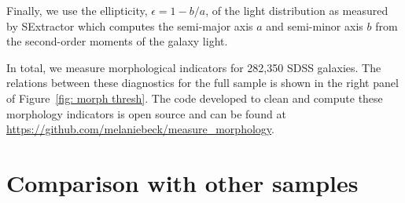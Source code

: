 Finally, we use the ellipticity, $\epsilon = 1 - b/a$, of the light distribution as measured by SExtractor which computes the semi-major axis $a$ and semi-minor axis $b$ from the second-order moments of the galaxy light.  

In total, we measure morphological indicators for 282,350 SDSS galaxies. The relations between these diagnostics for the full sample is shown in the right panel of Figure~\ref{fig: morph thresh}. The code developed to clean and compute these morphology indicators is open source and can be found at \url{https://github.com/melaniebeck/measure_morphology}.



\section{Comparison with other samples}